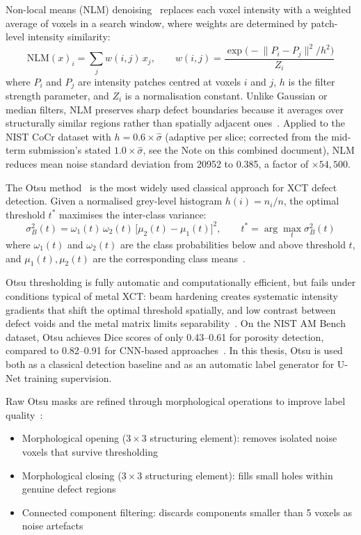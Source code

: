 Non-local means (NLM) denoising~\citep{Buades2005} replaces each voxel intensity with a weighted
average of voxels in a search window, where weights are determined by patch-level intensity
similarity:
\begin{equation}
\mathrm{NLM}(x)_i = \sum_j w(i,j)\, x_j,
\qquad
w(i,j) = \frac{\exp\!\big(-\lVert P_i - P_j \rVert^2 / h^2\big)}{Z_i}
\label{eq:nlm}
\end{equation}
where $P_i$ and $P_j$ are intensity patches centred at voxels $i$ and $j$, $h$ is the filter strength
parameter, and $Z_i$ is a normalisation constant. Unlike Gaussian or median filters, NLM preserves
sharp defect boundaries because it averages over structurally similar regions rather than spatially
adjacent ones~\citep{Buades2005}. Applied to the NIST CoCr dataset with $h = 0.6 \times \hat{\sigma}$
(adaptive per slice; corrected from the mid-term submission's stated $1.0 \times \hat{\sigma}$, see
the Note on this combined document), NLM reduces mean noise standard deviation from 20952 to 0.385, a
factor of $\times 54{,}500$.

The Otsu method~\citep{Otsu1979} is the most widely used classical approach for XCT defect detection.
Given a normalised grey-level histogram $h(i) = n_i / n$, the optimal threshold $t^*$ maximises the
inter-class variance:
\begin{equation}
\sigma_B^2(t) = \omega_1(t)\, \omega_2(t)\, \big[\mu_2(t) - \mu_1(t)\big]^2,
\qquad t^* = \arg\max_t \sigma_B^2(t)
\label{eq:otsu}
\end{equation}
where $\omega_1(t)$ and $\omega_2(t)$ are the class probabilities below and above threshold $t$, and
$\mu_1(t), \mu_2(t)$ are the corresponding class means~\citep{Otsu1979}.

Otsu thresholding is fully automatic and computationally efficient, but fails under conditions
typical of metal XCT: beam hardening creates systematic intensity gradients that shift the optimal
threshold spatially, and low contrast between defect voids and the metal matrix limits
separability~\citep{Bellens2021}. On the NIST AM Bench dataset, Otsu achieves Dice scores of only
0.43--0.61 for porosity detection, compared to 0.82--0.91 for CNN-based approaches~\citep{Wong2022}.
In this thesis, Otsu is used both as a classical detection baseline and as an automatic label
generator for U-Net training supervision.

Raw Otsu masks are refined through morphological operations to improve label
quality~\citep{Deshpande2024}:
\begin{itemize}
\item Morphological opening ($3\times3$ structuring element): removes isolated noise voxels that
  survive thresholding
\item Morphological closing ($3\times3$ structuring element): fills small holes within genuine
  defect regions
\item Connected component filtering: discards components smaller than 5 voxels as noise artefacts
\end{itemize}

